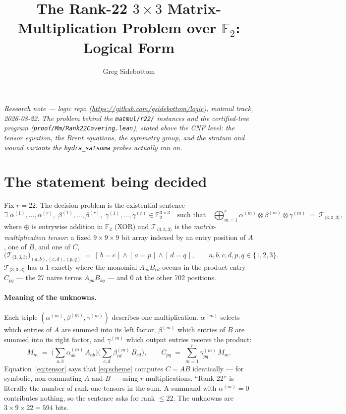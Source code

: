 \documentclass[10pt]{article}
\title{\bfseries The Rank-22 $3\times3$ Matrix-Multiplication Problem over
  $\mathbb F_2$: Logical Form}
\author{Greg Sidebottom}
\date{}
\newcommand{\F}{\mathbb F_2}
\newcommand{\T}{\mathcal T_{\langle 3,3,3\rangle}}
\newcommand{\iv}[1]{[\,#1\,]}
\newcommand{\al}[1]{\alpha^{(#1)}}
\newcommand{\be}[1]{\beta^{(#1)}}
\newcommand{\ga}[1]{\gamma^{(#1)}}
\begin{document}
\maketitle
\vspace{-3em}
\begin{center}
\itshape Research note --- logic repo
(\url{https://github.com/gsidebottom/logic}), matmul track, 2026-08-22.
The problem behind the \texttt{matmul/r22/} instances and the
certified-tree program (\texttt{proof/Mm/Rank22Covering.lean}),
stated above the CNF level: the tensor equation, the Brent equations,
the symmetry group, and the stratum and wound variants the
\texttt{hydra\_satsuma} probes actually ran on.
\end{center}

\section{The statement being decided}

Fix $r = 22$. The decision problem is the existential sentence
\begin{equation}\label{eq:tensor}
  \exists\;\al{1},\dots,\al{r},\;\be{1},\dots,\be{r},\;\ga{1},\dots,\ga{r}
  \in \F^{3\times 3}\quad\text{such that}\quad
  \bigoplus_{m=1}^{r} \al{m}\otimes\be{m}\otimes\ga{m} \;=\; \T ,
\end{equation}
where $\oplus$ is entrywise addition in $\F$ (XOR) and $\T$ is the
\emph{matrix-multiplication tensor}: a fixed $9\times9\times9$ bit array
indexed by an entry position of $A$, one of $B$, and one of $C$,
\begin{equation}\label{eq:T}
  \big(\T\big)_{(a,b),(c,d),(p,q)} \;=\; \iv{b=c}\wedge\iv{a=p}\wedge\iv{d=q},
  \qquad a,b,c,d,p,q\in\{1,2,3\}.
\end{equation}
$\T$ has a 1 exactly where the monomial $A_{ab}B_{cd}$ occurs in the
product entry $C_{pq}$ --- the 27 naive terms $A_{pk}B_{kq}$ --- and 0
at the other 702 positions.

\paragraph{Meaning of the unknowns.}
Each triple $(\al{m},\be{m},\ga{m})$ describes one multiplication.
$\al{m}$ selects which entries of $A$ are summed into its left factor,
$\be{m}$ which entries of $B$ are summed into its right factor, and
$\ga{m}$ which output entries receive the product:
\begin{equation}\label{eq:scheme}
  M_m \;=\; \Big(\sum_{a,b}\al{m}_{ab}\,A_{ab}\Big)\Big(\sum_{c,d}\be{m}_{cd}\,B_{cd}\Big),
  \qquad
  C_{pq} \;=\; \sum_{m=1}^{r}\ga{m}_{pq}\,M_m .
\end{equation}
Equation~\eqref{eq:tensor} says that \eqref{eq:scheme} computes
$C = AB$ identically --- for symbolic, non-commuting $A$ and $B$ --- using
$r$ multiplications. ``Rank 22'' is literally the number of rank-one
tensors in the sum. A summand with $\al{m}=0$ contributes nothing, so
the sentence asks for rank $\le 22$. The unknowns are
$3\times 9\times 22 = 594$ bits.
\end{document}
